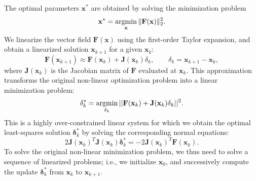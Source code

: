 The optimal parameters $\mathbf{x}^{*}$ are obtained by solving the minimization problem
$$ \mathbf{x}^{*} = \displaystyle \operatorname*{argmin}_\mathbf{x} \Vert \mathbf{F} (\mathbf{x}) \Vert_2^2.$$
%
We linearize the vector field $\mathbf{F}(\mathbf{x})$ using the first-order Taylor expansion,
and obtain a linearized solution $\mathbf{x}_{k+1}$ for a given $\mathbf{x}_k$:
$$ \mathbf{F}(\mathbf{x}_{k+1}) \approx \mathbf{F}(\mathbf{x}_{k})+\mathbf{J}(\mathbf{x}_{k})\delta_k,\qquad \delta_k = \mathbf{x}_{k+1}-\mathbf{x}_{k},$$
where $\mathbf{J}(\mathbf{x}_k)$ is the Jacobian matrix of $\mathbf{F}$ evaluated at $\mathbf{x}_k$.
This approximation transforms the original non-linear optimization problem into a linear minimization problem:
$$
\mathbf{\delta}_{k}^{*}=\operatorname*{argmin}_{\mathbf{\delta}_{k}}{||\mathbf{F}(\mathbf{x}_{k})+\mathbf{J}(\mathbf{x}_{k})\mathbf{\delta}_{k}||^2}.
$$
This is a highly over-constrained linear system for which we obtain the optimal least-squares solution $\mathbf{\delta}_k^{*}$ by solving the corresponding normal equations:
$$
2 \mathbf{J}(\mathbf{x}_{k})^T\mathbf{J}(\mathbf{x}_{k})\mathbf{\delta}_{k}^{*} = - 2\mathbf{J}(\mathbf{x}_{k})^T\mathbf{F}(\mathbf{x}_{k}).
$$
To solve the original non-linear minimization problem, we thus need to solve a sequence of linearized problems;
i.e., we initialize $\mathbf{x}_0$, and successively compute the update $\mathbf{\delta}_k^{*}$ from $\mathbf{x}_k$ to $\mathbf{x}_{k+1}$.
